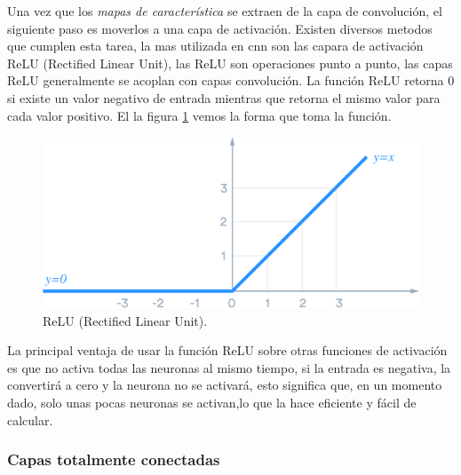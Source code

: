 Una vez que los \textit{mapas de característica} se extraen de la capa de convolución, el siguiente paso es moverlos a una capa de activación. Existen diversos metodos que cumplen esta tarea, la mas utilizada en  \ac{cnn} son las capara de activación ReLU (Rectified Linear Unit), las  ReLU son operaciones punto a punto, las capas ReLU generalmente se acoplan con capas convolución. La función ReLU retorna 0 si existe un valor negativo de entrada mientras que retorna el mismo valor para cada valor positivo. El la figura  \ref{Fig:relu} vemos la forma que toma la función.

\begin{figure}[H]
 \centering
  \includegraphics[scale=0.25,keepaspectratio=true,clip=true]{imagenes/MarcoTeorico/ReLU_1.png}
  \caption{ReLU (Rectified Linear Unit).}%
  \label{Fig:relu}
\end{figure}


La principal ventaja de usar la función ReLU sobre otras funciones de activación es que no activa todas las neuronas al mismo tiempo, si la entrada es negativa, la convertirá a cero y la neurona no se activará, esto significa que, en un momento dado, solo unas pocas neuronas se activan,lo que la hace eficiente y fácil de calcular.


\subsubsection{Capas totalmente conectadas}\label{sub:fully_connected}

